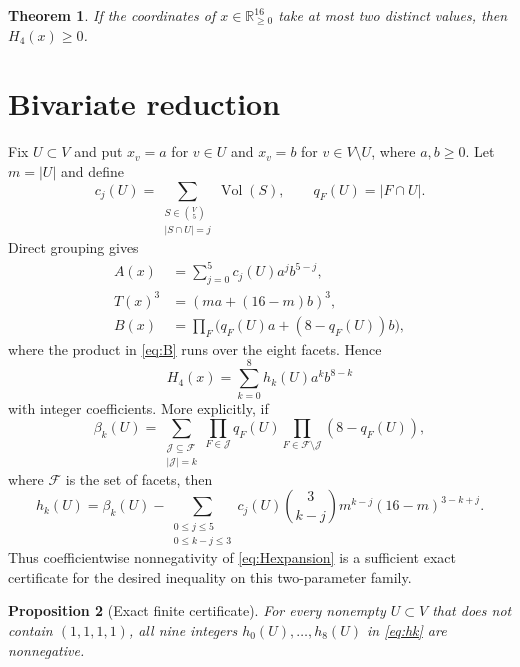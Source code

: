 \documentclass[11pt]{article}
\newtheorem{theorem}{Theorem}
\newtheorem{proposition}[theorem]{Proposition}
\begin{document}
\begin{theorem}\label{thm:two-values}
If the coordinates of $x\in\mathbb R_{\geq0}^{16}$ take at most two distinct
values, then $H_4(x)\geq0$.
\end{theorem}

\section{Bivariate reduction}

Fix $U\subset V$ and put $x_v=a$ for $v\in U$ and $x_v=b$ for
$v\in V\setminus U$, where $a,b\geq0$.  Let $m=|U|$ and define
\[
 c_j(U)=\sum_{\substack{S\in\binom V5\\|S\cap U|=j}}
          \operatorname{Vol}(S),
 \qquad
 q_F(U)=|F\cap U|.
\]
Direct grouping gives
\begin{align}
 A(x)&=\sum_{j=0}^{5}c_j(U)a^j b^{5-j},\label{eq:A}\\
 T(x)^3&=(ma+(16-m)b)^3,\label{eq:T}\\
 B(x)&=\prod_F\bigl(q_F(U)a+(8-q_F(U))b\bigr),\label{eq:B}
\end{align}
where the product in \eqref{eq:B} runs over the eight facets.  Hence
\begin{equation}\label{eq:Hexpansion}
 H_4(x)=\sum_{k=0}^{8}h_k(U)a^k b^{8-k}
\end{equation}
with integer coefficients.  More explicitly, if
\[
 \beta_k(U)=
 \sum_{\substack{\mathcal J\subseteq\mathcal F\\|\mathcal J|=k}}
 \prod_{F\in\mathcal J}q_F(U)
 \prod_{F\in\mathcal F\setminus\mathcal J}(8-q_F(U)),
\]
where $\mathcal F$ is the set of facets, then
\begin{equation}\label{eq:hk}
 h_k(U)=\beta_k(U)-
 \sum_{\substack{0\leq j\leq5\\0\leq k-j\leq3}}
 c_j(U)\binom{3}{k-j}m^{k-j}(16-m)^{3-k+j}.
\end{equation}
Thus coefficientwise nonnegativity of \eqref{eq:Hexpansion} is a sufficient
exact certificate for the desired inequality on this two-parameter family.

\begin{proposition}[Exact finite certificate]\label{prop:certificate}
For every nonempty $U\subset V$ that does not contain $(1,1,1,1)$, all nine
integers $h_0(U),\ldots,h_8(U)$ in \eqref{eq:hk} are nonnegative.
\end{proposition}
\end{document}
